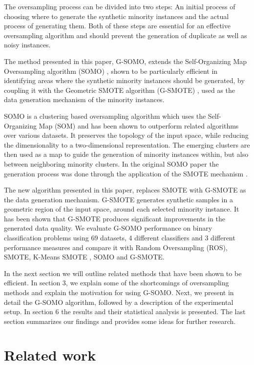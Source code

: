 \documentclass[parskip=full]{scrartcl}
\begin{document}
The oversampling process can be divided into two steps: An initial process of choosing where to generate the synthetic minority instances and the actual process of generating them. Both of these steps are essential for an effective oversampling algorithm and should prevent the generation of duplicate as well as noisy instances.

The method presented in this paper, G-SOMO, extends the Self-Organizing Map Oversampling algorithm (SOMO) \cite{Douzas2017}, shown to be particularly efficient in identifying areas where the synthetic minority instances should be generated, by coupling it with the Geometric SMOTE algorithm (G-SMOTE) \cite{Douzas2019}, used as the data generation mechanism of the minority instances.

SOMO is a clustering based oversampling algorithm which uses the Self-Organizing Map (SOM) and has been shown to outperform related algorithms over various datasets. It preserves the topology of the input space, while reducing the dimensionality to a two-dimensional representation. The emerging clusters are then used as a map to guide the generation of minority instances within, but also between neighboring minority clusters. In the original SOMO paper the generation process was done through the application of the SMOTE mechanism \cite{Chawla2002}.

The new algorithm presented in this paper, replaces SMOTE with G-SMOTE as the data generation mechanism. G-SMOTE generates synthetic samples in a geometric region of the input space, around each selected minority instance. It has been shown that G-SMOTE produces significant improvements in the generated data quality. We evaluate G-SOMO performance on binary classification problems using 69 datasets, 4 different classifiers and 3 different performance measures and compare it with Random Oversampling (ROS), SMOTE, K-Means SMOTE \cite{Douzas2018a}, SOMO and G-SMOTE.

In the next section we will outline related methods that have been shown to be efficient. In section 3, we explain some of the shortcomings of oversampling methods and explain the motivation for using G-SOMO. Next, we present in detail the G-SOMO algorithm, followed by a description of the experimental setup. In section 6 the results and their statistical analysis is presented. The last section summarizes our findings and provides some ideas for further research.

\section{Related work}
\end{document}
